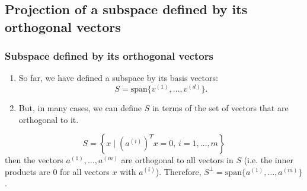 \subsection{Projection of a subspace defined by its orthogonal vectors}
    \subsubsection{Subspace defined by its orthogonal vectors}
    \begin{intuition}
        \begin{enumerate}

            \item So far, we have defined a subspace by its basis vectors:
            \[
            S = \text{span}\{v^{(1)}, \dots, v^{(d)}\}.
            \]
            
            \item But, in many cases, we can define \( S \) in terms of the set of vectors that are orthogonal to it. 
        \end{enumerate}
    \end{intuition}
    
    \begin{definition}
        \begin{equation*}
            S = \left\{ x \mid \left( a^{(i)} \right)^T x = 0, \, i = 1, \dots, m \right\}
        \end{equation*}
        then the vectors \( a^{(1)}, \dots, a^{(m)} \) are orthogonal to all vectors in \( S \) (i.e. the inner products are $0$ for all vectors $x$ with $a^{(i)}$). Therefore, $S^\perp = \text{span} \{ a^{(1)}, \dots, a^{(m)} \}$.
    \end{definition}

